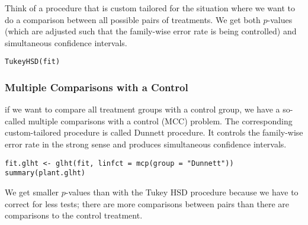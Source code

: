 Think of a procedure that is custom tailored for the situation where we want to do a comparison between all possible pairs of treatments. We get both $p$-values (which are adjusted such that the family-wise error rate is being controlled) and simultaneous confidence intervals.
\begin{lstlisting}
TukeyHSD(fit)
\end{lstlisting}


\subsubsection{Multiple Comparisons with a Control}

 if we want to compare all treatment groups with a control group, we have a so-called multiple comparisons with a control (MCC) problem. The corresponding custom-tailored procedure is called Dunnett procedure. It controls the family-wise error rate in the strong sense and produces simultaneous confidence intervals. 
 
\begin{lstlisting}
fit.glht <- glht(fit, linfct = mcp(group = "Dunnett"))
summary(plant.glht)
\end{lstlisting}

 We get smaller $p$-values than with the Tukey HSD procedure because we have to correct for less tests; there are more comparisons between pairs than there are comparisons to the control treatment.
